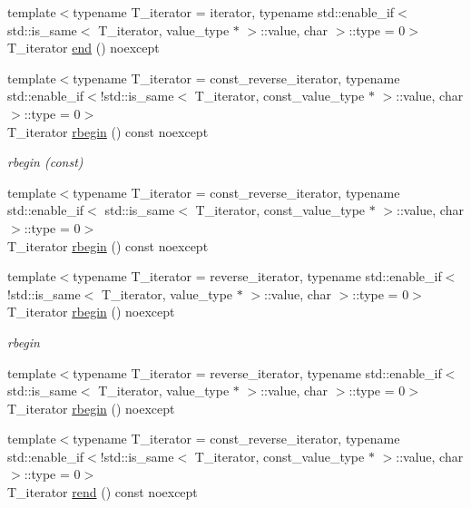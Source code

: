 \begin{DoxyCompactItemize}
{\footnotesize template$<$typename T\+\_\+iterator  = iterator, typename std\+::enable\+\_\+if$<$ std\+::is\+\_\+same$<$ T\+\_\+iterator, value\+\_\+type $\ast$ $>$\+::value, char $>$\+::type  = 0$>$ }\\T\+\_\+iterator \hyperlink{classIceBRG_1_1labeled__array__row__reference_a24df418e36063069ab29cd3a33e95154}{end} () noexcept
\item 
{\footnotesize template$<$typename T\+\_\+iterator  = const\+\_\+reverse\+\_\+iterator, typename std\+::enable\+\_\+if$<$!std\+::is\+\_\+same$<$ T\+\_\+iterator, const\+\_\+value\+\_\+type $\ast$ $>$\+::value, char $>$\+::type  = 0$>$ }\\T\+\_\+iterator \hyperlink{classIceBRG_1_1labeled__array__row__reference_af456f66a8f20ba0ba7a0d0af09cd24d3}{rbegin} () const  noexcept
\begin{DoxyCompactList}\small\item\em rbegin (const) \end{DoxyCompactList}\item 
{\footnotesize template$<$typename T\+\_\+iterator  = const\+\_\+reverse\+\_\+iterator, typename std\+::enable\+\_\+if$<$ std\+::is\+\_\+same$<$ T\+\_\+iterator, const\+\_\+value\+\_\+type $\ast$ $>$\+::value, char $>$\+::type  = 0$>$ }\\T\+\_\+iterator \hyperlink{classIceBRG_1_1labeled__array__row__reference_af456f66a8f20ba0ba7a0d0af09cd24d3}{rbegin} () const  noexcept
\item 
{\footnotesize template$<$typename T\+\_\+iterator  = reverse\+\_\+iterator, typename std\+::enable\+\_\+if$<$!std\+::is\+\_\+same$<$ T\+\_\+iterator, value\+\_\+type $\ast$ $>$\+::value, char $>$\+::type  = 0$>$ }\\T\+\_\+iterator \hyperlink{classIceBRG_1_1labeled__array__row__reference_a6f4b44fd665e3de18cf66acbf7e7a684}{rbegin} () noexcept
\begin{DoxyCompactList}\small\item\em rbegin \end{DoxyCompactList}\item 
{\footnotesize template$<$typename T\+\_\+iterator  = reverse\+\_\+iterator, typename std\+::enable\+\_\+if$<$ std\+::is\+\_\+same$<$ T\+\_\+iterator, value\+\_\+type $\ast$ $>$\+::value, char $>$\+::type  = 0$>$ }\\T\+\_\+iterator \hyperlink{classIceBRG_1_1labeled__array__row__reference_a6f4b44fd665e3de18cf66acbf7e7a684}{rbegin} () noexcept
\item 
{\footnotesize template$<$typename T\+\_\+iterator  = const\+\_\+reverse\+\_\+iterator, typename std\+::enable\+\_\+if$<$!std\+::is\+\_\+same$<$ T\+\_\+iterator, const\+\_\+value\+\_\+type $\ast$ $>$\+::value, char $>$\+::type  = 0$>$ }\\T\+\_\+iterator \hyperlink{classIceBRG_1_1labeled__array__row__reference_a5a033e4890a28fc1fc854e69892865dd}{rend} () const  noexcept

\end{DoxyCompactItemize}
